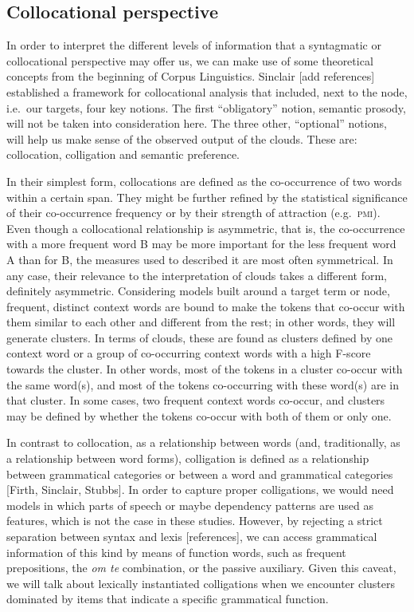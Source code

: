 \documentclass[
]{book}
\begin{document}
\hypertarget{collocationally}{%
\subsection{Collocational perspective}\label{collocationally}}

In order to interpret the different levels of information that a syntagmatic or collocational perspective may offer us, we can make use of some theoretical concepts from the beginning of Corpus Linguistics. Sinclair {[}add references{]} established a framework for collocational analysis that included, next to the node, i.e.~our targets, four key notions. The first ``obligatory'' notion, semantic prosody, will not be taken into consideration here. The three other, ``optional'' notions, will help us make sense of the observed output of the clouds. These are: collocation, colligation and semantic preference.

In their simplest form, collocations are defined as the co-occurrence of two words within a certain span. They might be further refined by the statistical significance of their co-occurrence frequency or by their strength of attraction (e.g.~\textsc{pmi}). Even though a collocational relationship is asymmetric, that is, the co-occurrence with a more frequent word B may be more important for the less frequent word A than for B, the measures used to described it are most often symmetrical. In any case, their relevance to the interpretation of clouds takes a different form, definitely asymmetric. Considering models built around a target term or node, frequent, distinct context words are bound to make the tokens that co-occur with them similar to each other and different from the rest; in other words, they will generate clusters. In terms of clouds, these are found as clusters defined by one context word or a group of co-occurring context words with a high F-score towards the cluster. In other words, most of the tokens in a cluster co-occur with the same word(s), and most of the tokens co-occurring with these word(s) are in that cluster.
In some cases, two frequent context words co-occur, and clusters may be defined by whether the tokens co-occur with both of them or only one.

In contrast to collocation, as a relationship between words (and, traditionally, as a relationship between word forms), colligation is defined as a relationship between grammatical categories or between a word and grammatical categories {[}Firth, Sinclair, Stubbs{]}. In order to capture proper colligations, we would need models in which parts of speech or maybe dependency patterns are used as features, which is not the case in these studies. However, by rejecting a strict separation between syntax and lexis {[}references{]}, we can access grammatical information of this kind by means of function words, such as frequent prepositions, the \emph{om te} combination, or the passive auxiliary. Given this caveat, we will talk about lexically instantiated colligations when we encounter clusters dominated by items that indicate a specific grammatical function.
\end{document}
